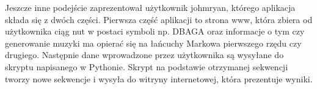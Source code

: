 Jeszcze inne podejście zaprezentował użytkownik johmryan, którego aplikacja składa się z dwóch części. Pierwsza część aplikacji to strona www, która zbiera od użytkownika ciąg nut w postaci symboli np. DBAGA oraz informacje o tym czy generowanie muzyki ma opierać się na łańcuchy Markowa pierwszego rzędu czy drugiego. Następnie dane wprowadzone przez użytkownika są wysyłane do skryptu napisanego w Pythonie. Skrypt na podstawie otrzymanej sekwencji tworzy nowe sekwencje i wysyła do witryny internetowej, która prezentuje wyniki. 
